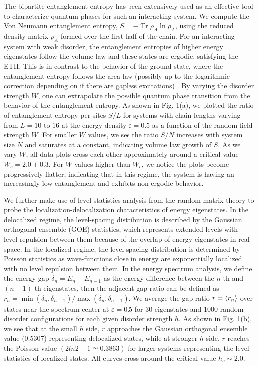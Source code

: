 \documentclass[prl,aps,epsf,showpacs,twocolumn]{revtex4}
\DeclareMathOperator{\tr}{Tr}
\begin{document}
The bipartite entanglement entropy has been extensively used as an effective tool 
to characterize quantum phases for such an interacting system\cite{nandkishore2015,
luitz2015, kjall2014}. We compute the Von Neumann entanglement entropy, $S = -\tr\rho_A
\ln\rho_A$, using the reduced density matrix $\rho_A$ formed over the first half of
the chain. For an interacting system with weak disorder, the entanglement entropies
of higher energy eigenstates follow the volume law and these states are ergodic,
satisfying the ETH\cite{nandkishore2015, altman2015}. This is in contrast to the
behavior of the ground state, where the entanglement entropy follows the area law
(possibly up to the logarithmic correction depending on if there are gapless excitations)
\cite{grover2014}.
By varying the disorder strength $W$, one can extrapolate the possible quantum phase
transition from the behavior of the entanglement entropy\cite{kjall2014, luitz2015}.
As shown in Fig. 1(a), we plotted the ratio of entanglement entropy per sites $S/L$ for
systems with chain lengths varying from $L=10$ to $16$ at the energy density
$\varepsilon =0.5$ as a function of the random field strength $W$. For smaller $W$
values, we see the ratio $S/N$ increases with system size $N$ and saturates at a
constant, indicating volume law growth of $S$. As we vary $W$, all data plots
cross each other approximately around a critical value $W_c = 2.0\pm 0.3$. For $W$ values
higher than $W_c$, we notice the plots become progressively flatter, indicating that
in this regime, the system is having an increasingly low entanglement and exhibits
non-ergodic behavior.


We further make use of level statistics analysis from the random matrix theory
\cite{atas2013,oganesyan2007} to probe the localization-delocalization characteristics
of energy eigenstates. In the delocalized regime, the level-spacing distribution
is described by the Gaussian orthogonal ensemble (GOE) statistics, which represents
extended levels with level-repulsion between them because of the overlap of
energy eigenstates in real space. In the localized regime, the level-spacing
distribution is determined by Poisson statistics as wave-functions close in energy
are exponentially localized with no level repulsion between them\cite{mehta1991}.
In the energy spectrum analysis\cite{luitz2015}, we define the energy gap
$\delta_n=E_n-E_{n-1}$ as the energy difference between the $n$-th and $(n-1)$-th
eigenstates, then the adjacent gap ratio can be defined as
$r_n=\min(\delta_n, \delta_{n+1})/\max(\delta_n, \delta_{n+1})$.
We average the gap ratio $r=\braket{r_n}$ over states near the spectrum center at
$\varepsilon=0.5$ for 30 eigenstates and 1000 random disorder configurations
for each given disorder strength $h$. As shown in Fig. 1(b), we see that at the small
$h$ side, $r$ approaches the Gaussian orthogonal ensemble value (0.5307) representing
delocalized states, while at stronger $h$ side, $r$ reaches the Poisson value
$(2ln2-1\simeq 0.3863)$ for larger systems representing the level statistics of
localized states. All curves cross around the critical value $h_c \sim 2.0$. 
\end{document}
